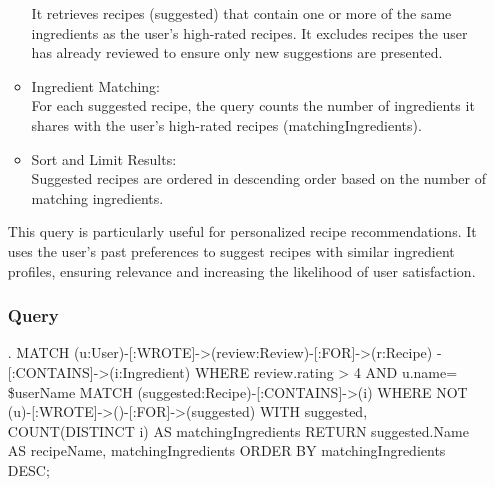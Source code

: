 \begin{enumerate}
\begin{itemize}
    It retrieves recipes (suggested) that contain one or more of the same ingredients as the user's high-rated recipes. It excludes recipes the user has already reviewed to ensure only new suggestions are presented.
    \item Ingredient Matching:\\
    For each suggested recipe, the query counts the number of ingredients it shares with the user's high-rated recipes (matchingIngredients).
    \item Sort and Limit Results:\\
    Suggested recipes are ordered in descending order based on the number of matching ingredients.
\end{itemize}
This query is particularly useful for personalized recipe recommendations. It uses the user's past preferences to suggest recipes with similar ingredient profiles, ensuring relevance and increasing the likelihood of user satisfaction.
    \subsubsection{Query}
\begin{CypherQuery}
.
MATCH (u:User)-[:WROTE]->(review:Review)-[:FOR]->(r:Recipe)
-[:CONTAINS]->(i:Ingredient)
WHERE review.rating > 4 AND u.name= \$userName
MATCH (suggested:Recipe)-[:CONTAINS]->(i)
WHERE NOT (u)-[:WROTE]->()-[:FOR]->(suggested)
WITH suggested, COUNT(DISTINCT i) AS matchingIngredients
RETURN suggested.Name AS recipeName, matchingIngredients
ORDER BY matchingIngredients DESC;
\end{CypherQuery}

\end{enumerate}
